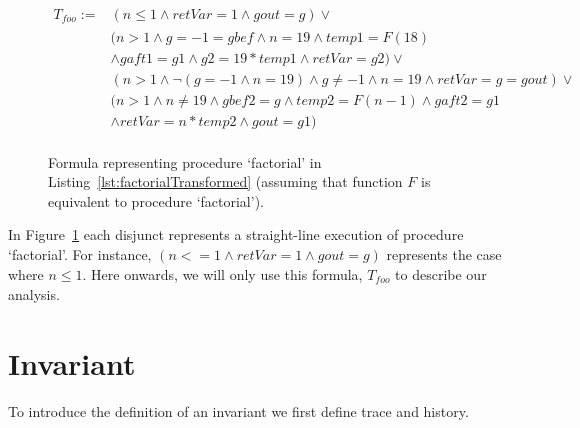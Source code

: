 \documentclass{llncs}
\newcommand{\foo}{\textit{foo}}
\newcommand{\pathCondition}{\mathit{T_{\foo}}}
\newcommand{\retVar}{\textit{retVar}}
\newcommand{\F}{\mathit{F}}
\newcommand{\n}{\textit{n}}
\newcommand{\g}{\textit{g}}
\newcommand{\gout}{\textit{gout}}
\newcommand{\gbef}{\textit{gbef}}
\newcommand{\gaft}{\textit{gaft}}
\begin{document}
\begin{figure}
  \begin{align*}
    \pathCondition :=
    &(n \leq 1 \wedge retVar = 1 \wedge gout = g) \vee \\
    &(n > 1 \wedge g = -1 = gbef \wedge n = 19 \wedge temp1 = \F(18) \\
    &\wedge gaft1 = g1 \wedge g2 = 19 * temp1
    \wedge retVar = g2) \vee\\
    &(n > 1 \wedge \neg( g = -1 \wedge n = 19) \wedge g \neq -1
    \wedge n = 19 \wedge retVar = g = gout) \vee\\
    &(n > 1 \wedge n \neq 19 \wedge gbef2 = g \wedge temp2 = \F( n
    - 1) \wedge gaft2 = g1\\
    &\wedge retVar = n * temp2 \wedge gout = g1)\\
  \end{align*}
  \caption{Formula representing procedure `factorial' in
    Listing~\ref{lst:factorialTransformed} (assuming that function
    $\F$ is equivalent to procedure `factorial').}
  \label{fig:pathCondition}
\end{figure}

In Figure~\ref{fig:pathCondition} each disjunct represents a
straight-line execution of procedure `factorial'. For instance, $(n <= 1
\wedge retVar = 1 \wedge gout = g)$ represents the case where $n \leq
1$. Here onwards, we will only use this formula, $\pathCondition$ to
describe our analysis.



\section{Invariant}

To introduce the definition of an invariant we first define trace and
history.
\end{document}
